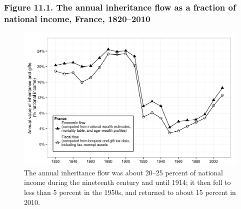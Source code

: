 \documentclass[t]{beamer}\usepackage[]{graphicx}\usepackage[]{color}
\newenvironment{knitrout}{}{} %
\begin{document}
\begin{frame}[label=Figure_11_1]
\frametitle{Figure 11.1. The annual inheritance flow as a fraction of national income, France, 1820--2010}
\begin{figure}[t]
\begin{minipage}[b]{\textwidth}
\centering
\begin{knitrout}\footnotesize
{}\color{fgcolor}

{\centering \includegraphics[width=1\linewidth]{figures/bw/Figure_11_1} 

}



\end{knitrout}
\caption{The annual inheritance flow was about 20–25 percent of national income during the nineteenth century and until 1914; it then fell to less than 5 percent in the 1950s, and returned to about 15 percent in 2010.}
\end{minipage}
\end{figure}
\end{frame}
\end{document}
